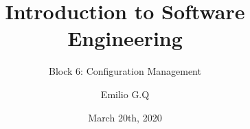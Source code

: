 \graphicspath{ {fig/} }
\title{Introduction to Software Engineering}
\subtitle{Block 6: Configuration Management}
\author{Emilio G.Q}
\date{March 20th, 2020}
